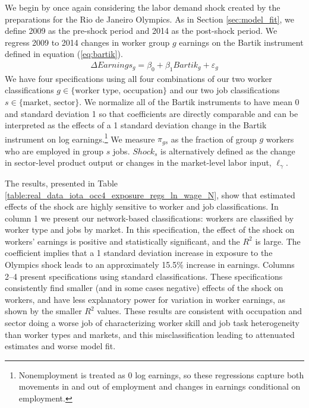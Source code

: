 \documentclass[12pt]{article}
\def\g{\gamma}
\theoremstyle{definition}
\theoremstyle{plain}
\def\ve{\varepsilon}
\begin{document}
We begin by once again considering the labor demand shock created by the preparations for the Rio de Janeiro Olympics. As in Section \ref{sec:model_fit}, we define 2009 as the pre-shock period and 2014 as the post-shock period. We regress 2009 to 2014 changes in worker group $g$ earnings on the Bartik instrument defined in equation (\ref{eq:bartik}). 
\begin{align}
	\Delta Earnings_g = \beta_0 + \beta_1 Bartik_g	+ \ve_g \label{eq:bartik_reg}
\end{align}
We have four specifications using all four combinations of our two worker classifications $g\in\{\text{worker type, occupation}\}$ and our two job classifications $s\in\{\text{market, sector}\}$. We normalize all of the Bartik instruments to have mean 0 and standard deviation 1 so that coefficients are directly comparable and can be interpreted as the effects of a 1 standard deviation change in the Bartik instrument on log earnings.\footnote{Nonemployment is treated as 0 log earnings, so these regressions capture both movements in and out of employment and changes in earnings conditional on employment.} We measure $\pi_{gs}$ as the fraction of group $g$ workers who are employed in group $s$ jobs. $Shock_s$ is alternatively defined as the change in sector-level product output or changes in the market-level labor input, $\ell_{\g}$. 

The results, presented in  Table \ref{table:real_data_iota_occ4_exposure_regs_ln_wage_N}, show that estimated effects of the shock are highly sensitive to worker and job classifications. In column 1 we present our network-based classifications: workers are classified by worker type and jobs by market. In this specification, the effect of the shock on workers' earnings is positive and statistically significant, and the $R^2$ is large. The coefficient implies that a 1 standard deviation increase in exposure to the Olympics shock leads to an approximately 15.5\% increase in earnings. Columns 2--4 present specifications using standard classifications. These specifications consistently find smaller (and in some cases negative) effects of the shock on workers, and have less explanatory power for variation in worker earnings, as shown by the smaller $R^2$ values. These results are consistent with occupation and sector doing a worse job of characterizing worker skill and job task heterogeneity than worker types and markets, and this misclassification leading to attenuated estimates and worse model fit. %
\end{document}
